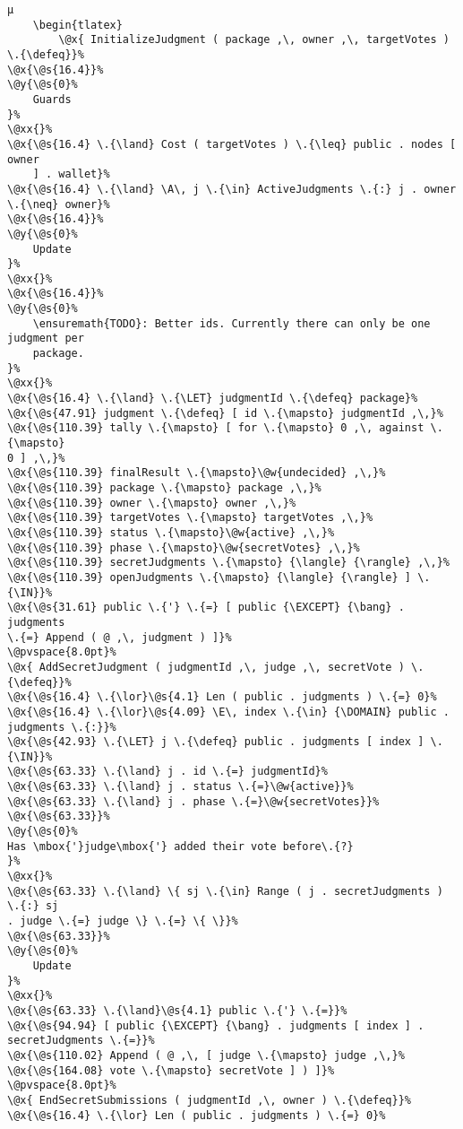 \begin{lstlisting}[caption=TLA\textsuperscript+ model of chaincode, label=lst:ChaincodeModel]
	µ
	\begin{tlatex}
		\@x{ InitializeJudgment ( package ,\, owner ,\, targetVotes ) \.{\defeq}}%
\@x{\@s{16.4}}%
\@y{\@s{0}%
    Guards
}%
\@xx{}%
\@x{\@s{16.4} \.{\land} Cost ( targetVotes ) \.{\leq} public . nodes [ owner
    ] . wallet}%
\@x{\@s{16.4} \.{\land} \A\, j \.{\in} ActiveJudgments \.{:} j . owner
\.{\neq} owner}%
\@x{\@s{16.4}}%
\@y{\@s{0}%
    Update
}%
\@xx{}%
\@x{\@s{16.4}}%
\@y{\@s{0}%
    \ensuremath{TODO}: Better ids. Currently there can only be one judgment per
    package.
}%
\@xx{}%
\@x{\@s{16.4} \.{\land} \.{\LET} judgmentId \.{\defeq} package}%
\@x{\@s{47.91} judgment \.{\defeq} [ id \.{\mapsto} judgmentId ,\,}%
\@x{\@s{110.39} tally \.{\mapsto} [ for \.{\mapsto} 0 ,\, against \.{\mapsto}
0 ] ,\,}%
\@x{\@s{110.39} finalResult \.{\mapsto}\@w{undecided} ,\,}%
\@x{\@s{110.39} package \.{\mapsto} package ,\,}%
\@x{\@s{110.39} owner \.{\mapsto} owner ,\,}%
\@x{\@s{110.39} targetVotes \.{\mapsto} targetVotes ,\,}%
\@x{\@s{110.39} status \.{\mapsto}\@w{active} ,\,}%
\@x{\@s{110.39} phase \.{\mapsto}\@w{secretVotes} ,\,}%
\@x{\@s{110.39} secretJudgments \.{\mapsto} {\langle} {\rangle} ,\,}%
\@x{\@s{110.39} openJudgments \.{\mapsto} {\langle} {\rangle} ] \.{\IN}}%
\@x{\@s{31.61} public \.{'} \.{=} [ public {\EXCEPT} {\bang} . judgments
\.{=} Append ( @ ,\, judgment ) ]}%
\@pvspace{8.0pt}%
\@x{ AddSecretJudgment ( judgmentId ,\, judge ,\, secretVote ) \.{\defeq}}%
\@x{\@s{16.4} \.{\lor}\@s{4.1} Len ( public . judgments ) \.{=} 0}%
\@x{\@s{16.4} \.{\lor}\@s{4.09} \E\, index \.{\in} {\DOMAIN} public .
judgments \.{:}}%
\@x{\@s{42.93} \.{\LET} j \.{\defeq} public . judgments [ index ] \.{\IN}}%
\@x{\@s{63.33} \.{\land} j . id \.{=} judgmentId}%
\@x{\@s{63.33} \.{\land} j . status \.{=}\@w{active}}%
\@x{\@s{63.33} \.{\land} j . phase \.{=}\@w{secretVotes}}%
\@x{\@s{63.33}}%
\@y{\@s{0}%
Has \mbox{'}judge\mbox{'} added their vote before\.{?}
}%
\@xx{}%
\@x{\@s{63.33} \.{\land} \{ sj \.{\in} Range ( j . secretJudgments ) \.{:} sj
. judge \.{=} judge \} \.{=} \{ \}}%
\@x{\@s{63.33}}%
\@y{\@s{0}%
    Update
}%
\@xx{}%
\@x{\@s{63.33} \.{\land}\@s{4.1} public \.{'} \.{=}}%
\@x{\@s{94.94} [ public {\EXCEPT} {\bang} . judgments [ index ] .
secretJudgments \.{=}}%
\@x{\@s{110.02} Append ( @ ,\, [ judge \.{\mapsto} judge ,\,}%
\@x{\@s{164.08} vote \.{\mapsto} secretVote ] ) ]}%
\@pvspace{8.0pt}%
\@x{ EndSecretSubmissions ( judgmentId ,\, owner ) \.{\defeq}}%
\@x{\@s{16.4} \.{\lor} Len ( public . judgments ) \.{=} 0}%

\end{lstlisting}
